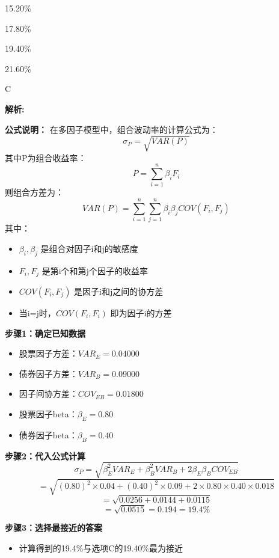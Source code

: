 \documentclass{article}
\newenvironment{explanation}
{\textbf{解析:}\par}
{\par}
\begin{document}
\begin{choices}
    \item 15.20\%
    \item 17.80\%
    \item 19.40\%
    \item 21.60\%
\end{choices}

\begin{correctanswer}
    C
\end{correctanswer}

\begin{explanation}
    \textbf{公式说明：}
    在多因子模型中，组合波动率的计算公式为：
    \[
    \sigma_P = \sqrt{VAR(P)}
    \]
    其中P为组合收益率：
    \[
    P = \sum_{i=1}^n \beta_i F_i
    \]
    则组合方差为：
    \[
    VAR(P) = \sum_{i=1}^n \sum_{j=1}^n \beta_i \beta_j COV(F_i, F_j)
    \]
    其中：
    \begin{itemize}
        \item $\beta_i, \beta_j$ 是组合对因子i和j的敏感度
        \item $F_i, F_j$ 是第i个和第j个因子的收益率
        \item $COV(F_i, F_j)$ 是因子i和j之间的协方差
        \item 当i=j时，$COV(F_i, F_i)$ 即为因子i的方差
    \end{itemize}

    \textbf{步骤1：确定已知数据}
    \begin{itemize}
        \item 股票因子方差：$VAR_E = 0.04000$
        \item 债券因子方差：$VAR_B = 0.09000$
        \item 因子间协方差：$COV_{EB} = 0.01800$
        \item 股票因子beta：$\beta_E = 0.80$
        \item 债券因子beta：$\beta_B = 0.40$
    \end{itemize}

    \textbf{步骤2：代入公式计算}
    \[
    \sigma_P = \sqrt{\beta_E^2 VAR_E + \beta_B^2 VAR_B + 2\beta_E \beta_B COV_{EB}}
    \]
    \[
    = \sqrt{(0.80)^2 \times 0.04 + (0.40)^2 \times 0.09 + 2 \times 0.80 \times 0.40 \times 0.018}
    \]
    \[
    = \sqrt{0.0256 + 0.0144 + 0.0115}
    \]
    \[
    = \sqrt{0.0515} = 0.194 = 19.4\%
    \]

    \textbf{步骤3：选择最接近的答案}
    \begin{itemize}
        \item 计算得到的19.4\%与选项C的19.40\%最为接近
    \end{itemize}
\end{explanation}
\end{document}
